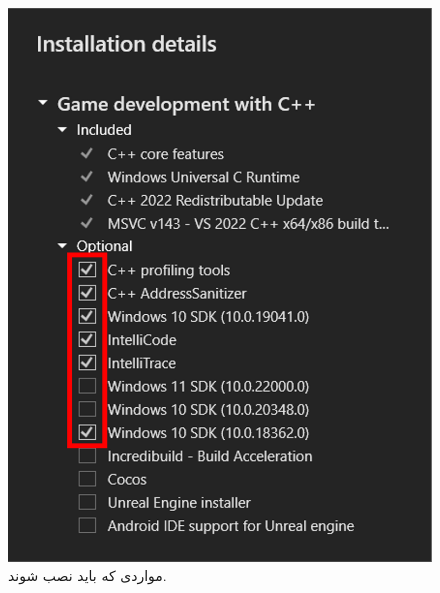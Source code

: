 {\begin{figure}[H]
        \includegraphics[scale=0.7]{Images/1.Intro.3.4.png}
        \caption{مواردی که باید نصب شوند.}
    \end{figure}
}
\textbf{\vspace{12pt}}

\title{
    \Large
}
\textbf{\vspace{14pt}}

